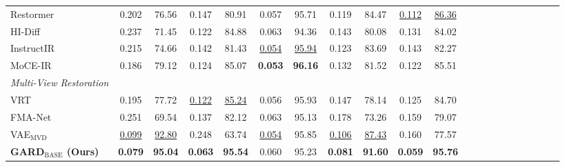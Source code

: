 \begin{table}[h]
{\begin{tabular}{lccccc ccccc ccccc ccccc}
Restormer~\cite{zamir2022restormer}
&   0.202    &      76.56
&   0.147    &      80.91
&   0.057    &       95.71
&   0.119    &      84.47
&   \underline{0.112}    &      \underline{86.36}
\\



HI-Diff~\cite{chen2023hierarchical}
&   0.237    &       71.45
&   0.122    &       84.88
&   0.063    &       94.36
&   0.143    &       80.08
&   0.131    &       84.02
\\


InstructIR~\cite{conde2024high}
&   0.215    &       74.66
&   0.142    &       81.43
&   \underline{0.054}   &      \underline{95.94}
&   0.123    &       83.69
&   0.143    &       82.27
\\


MoCE-IR~\cite{zamfir2024complexityexperts}
&  0.186     &       79.12
&  0.124     &       85.07
&  \textbf{0.053}     &       \textbf{96.16}
&  0.132     &       81.52
&  0.122    &        85.51
\\


\midrule
\textit{Multi-View Restoration} \\
\midrule

VRT~\cite{liang2024vrt}
&   0.195    &      77.72
&   \underline{0.122}    &      \underline{85.24}
&   0.056    &      95.93
&   0.147    &      78.14
&   0.125    &      84.70
\\


FMA-Net~\cite{Youk_2024_CVPR}
&   0.251    &       69.54
&   0.137    &       82.12
&   0.063    &       95.13
&   0.178    &       73.26
&   0.159    &       79.07
\\


VAE$_\text{MVD}$
&    \underline{0.099}   &       \underline{92.80}
&    0.248   &       63.74
&    \underline{0.054}   &       95.85
&    \underline{0.106}   &       \underline{87.43}
&    0.160   &        77.57
\\




\textbf{GARD$_\text{BASE}$ (Ours)}
&   \textbf{0.079}    &   \textbf{95.04}
&   \textbf{0.063}    &   \textbf{95.54}
&   0.060    &   95.23
&   \textbf{0.081}   &    \textbf{91.60}
&   \textbf{0.059}    &   \textbf{95.76}
\\


\bottomrule
\end{tabular}
}
\end{table}

